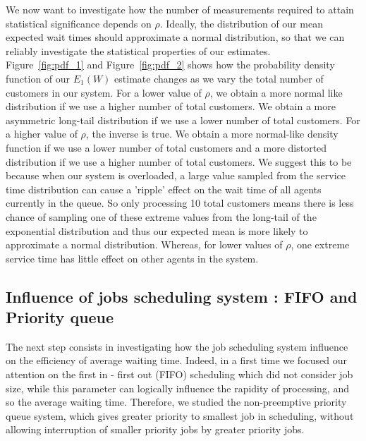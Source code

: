 \documentclass{article}
\begin{document}
    We now want to investigate how the number of measurements required to attain statistical significance depends on $\rho$. Ideally, the distribution of our mean expected wait times should approximate a normal distribution, so that we can reliably investigate the statistical properties of our estimates.\\
    Figure~\ref{fig:pdf_1} and Figure~\ref{fig:pdf_2} shows how the probability density function of our $E_1(W)$ estimate changes as we vary the total number of customers in our system. For a lower value of $\rho$, we obtain a more normal like distribution if we use a higher number of total customers. We obtain a more asymmetric long-tail distribution if we use a lower number of total customers. For a higher value of $\rho$, the inverse is true. We obtain a more normal-like density function if we use a lower number of total customers and a more distorted distribution if we use a higher number of total customers. We suggest this to be because when our system is overloaded, a large value sampled from the service time distribution can cause a 'ripple' effect on the wait time of all agents currently in the queue. So only processing 10 total customers means there is less chance of sampling one of these extreme values from the long-tail of the exponential distribution and thus our expected mean is more likely to approximate a normal distribution. Whereas, for lower values of $\rho$, one extreme service time has little effect on other agents in the system.\\

    \subsection*{Influence of jobs scheduling system : FIFO and Priority queue}

    The next step consists in investigating how the job scheduling system influence on the efficiency of average waiting time.
    Indeed, in a first time we focused our attention on the first in - first out (FIFO) scheduling which did not consider job size, while this parameter can logically influence the rapidity of processing, and so the average waiting time.
    Therefore, we studied the non-preemptive priority queue system, which gives greater priority to smallest job in scheduling, without allowing interruption of smaller priority jobs by greater priority jobs.\\
\end{document}
